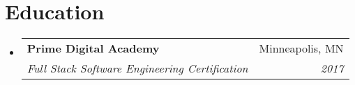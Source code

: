 \documentclass[letterpaper,11pt]{article}
\makeatletter
\newcommand{\resumeSubheading}[4]{
  \vspace{-2pt}\item
    \begin{tabular*}{0.97\textwidth}[t]{l@{\extracolsep{\fill}}r}
      \textbf{#1} & #2 \\
      \textit{\small#3} & \textit{\small #4} \\
    \end{tabular*}\vspace{-7pt}
}
\newcommand{\resumeSubHeadingListStart}{\begin{itemize}[leftmargin=0.15in, label={}]}
\newcommand{\resumeSubHeadingListEnd}{\end{itemize}}
\makeatother
\begin{document}
\section{Education}
  \resumeSubHeadingListStart
    \resumeSubheading
      {Prime Digital Academy}{Minneapolis, MN}
      {Full Stack Software Engineering Certification}{2017}
  \resumeSubHeadingListEnd


\end{document}
